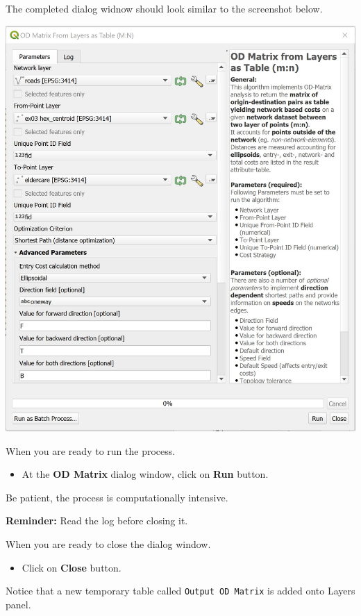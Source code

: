 \documentclass[
  letterpaper,
  DIV=11,
  numbers=noendperiod]{scrreprt}
\providecommand{\tightlist}{%
  \setlength{\itemsep}{0pt}\setlength{\parskip}{0pt}}\usepackage{longtable,booktabs,array}
\begin{document}
The completed dialog widnow should look similar to the screenshot below.

\includegraphics{./img09/image27.jpg}

When you are ready to run the process.

\begin{itemize}
\tightlist
\item
  At the \textbf{OD Matrix} dialog window, click on \textbf{Run} button.
\end{itemize}

Be patient, the process is computationally intensive.

\textbf{Reminder:} Read the log before closing it.

When you are ready to close the dialog window.

\begin{itemize}
\tightlist
\item
  Click on \textbf{Close} button.
\end{itemize}

Notice that a new temporary table called \texttt{Output\ OD\ Matrix} is
added onto Layers panel.
\end{document}
